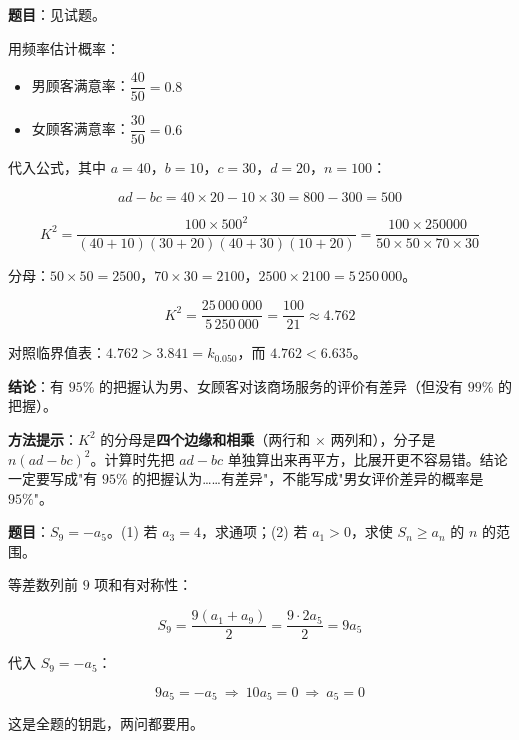 \textbf{题目}：见试题。


用频率估计概率：

\begin{itemize}
\item 男顾客满意率：$\dfrac{40}{50}=0.8$
\item 女顾客满意率：$\dfrac{30}{50}=0.6$
\end{itemize}


代入公式，其中 $a=40$，$b=10$，$c=30$，$d=20$，$n=100$：

\[ad-bc=40\times20-10\times30=800-300=500\]

\[K^{2}=\frac{100\times500^{2}}{(40+10)(30+20)(40+30)(10+20)}=\frac{100\times250000}{50\times50\times70\times30}\]

分母：$50\times50=2500$，$70\times30=2100$，$2500\times2100=5\,250\,000$。

\[K^{2}=\frac{25\,000\,000}{5\,250\,000}=\frac{100}{21}\approx4.762\]

对照临界值表：$4.762>3.841=k_{0.050}$，而 $4.762<6.635$。

\textbf{结论}：有 $95\%$ 的把握认为男、女顾客对该商场服务的评价有差异（但没有 $99\%$ 的把握）。

\begin{gktip}
\textbf{方法提示}：$K^{2}$ 的分母是\textbf{四个边缘和相乘}（两行和 × 两列和），分子是 $n(ad-bc)^{2}$。计算时先把 $ad-bc$ 单独算出来再平方，比展开更不容易错。结论一定要写成"有 $95\%$ 的把握认为……有差异"，不能写成"男女评价差异的概率是 $95\%$"。
\end{gktip}

\par\medskip


\textbf{题目}：$S_9=-a_5$。(1) 若 $a_3=4$，求通项；(2) 若 $a_1>0$，求使 $S_n\ge a_n$ 的 $n$ 的范围。


等差数列前 $9$ 项和有对称性：

\[S_9=\frac{9\left(a_1+a_9\right)}2=\frac{9\cdot2a_5}2=9a_5\]

代入 $S_9=-a_5$：

\[9a_5=-a_5\ \Longrightarrow\ 10a_5=0\ \Longrightarrow\ \boxed{a_5=0}\]

这是全题的钥匙，两问都要用。


